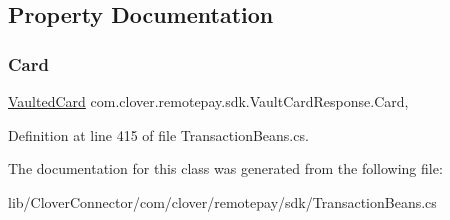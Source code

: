 \subsection{Property Documentation}
\mbox{\label{classcom_1_1clover_1_1remotepay_1_1sdk_1_1_vault_card_response_a10711fbd9fff70f8a7f98e45bcaaedbd}} 
\subsubsection{\texorpdfstring{Card}{Card}}
{\footnotesize\ttfamily \hyperlink{classcom_1_1clover_1_1sdk_1_1v3_1_1payments_1_1_vaulted_card}{Vaulted\+Card} com.\+clover.\+remotepay.\+sdk.\+Vault\+Card\+Response.\+Card\hspace{0.3cm}{\ttfamily [get]}, {\ttfamily [set]}}



Definition at line 415 of file Transaction\+Beans.\+cs.



The documentation for this class was generated from the following file\+:\begin{DoxyCompactItemize}
\item 
lib/\+Clover\+Connector/com/clover/remotepay/sdk/Transaction\+Beans.\+cs\end{DoxyCompactItemize}
